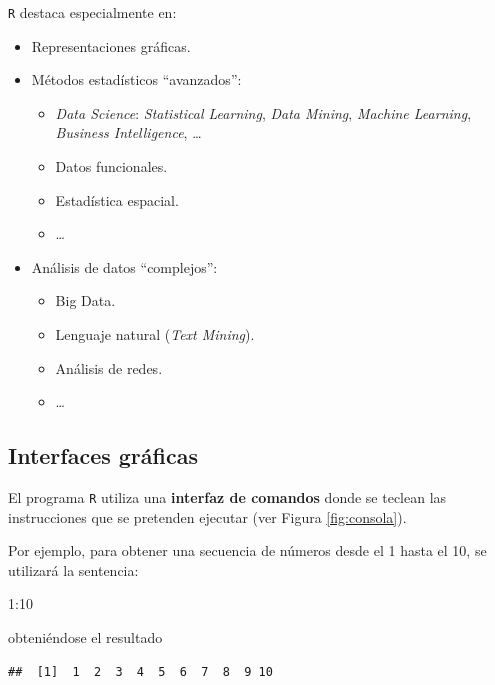 \documentclass[
]{book}
\newenvironment{Shaded}{\begin{snugshade}}{\end{snugshade}}
\newcommand{\DecValTok}[1]{\textcolor[rgb]{0.00,0.00,0.81}{#1}}
\newcommand{\SpecialCharTok}[1]{\textcolor[rgb]{0.00,0.00,0.00}{#1}}
\theoremstyle{break}
\begin{document}
\texttt{R} destaca especialmente en:

\begin{itemize}
\item
  Representaciones gráficas.
\item
  Métodos estadísticos ``avanzados'':

  \begin{itemize}
  \item
    \emph{Data Science}: \emph{Statistical Learning}, \emph{Data Mining},
    \emph{Machine Learning}, \emph{Business Intelligence}, \ldots{}
  \item
    Datos funcionales.
  \item
    Estadística espacial.
  \item
    \ldots{}
  \end{itemize}
\item
  Análisis de datos ``complejos'':

  \begin{itemize}
  \item
    Big Data.
  \item
    Lenguaje natural (\emph{Text Mining}).
  \item
    Análisis de redes.
  \item
    \ldots{}
  \end{itemize}
\end{itemize}

\hypertarget{interfaces-gruxe1ficas}{%
\subsection{Interfaces gráficas}\label{interfaces-gruxe1ficas}}

El programa \texttt{R}
utiliza una \textbf{interfaz de comandos} donde se teclean las instrucciones
que se pretenden ejecutar (ver Figura \ref{fig:consola}).

Por ejemplo, para obtener una secuencia de números desde el 1 hasta el
10, se utilizará la sentencia:

\begin{Shaded}
\begin{Highlighting}[]
\DecValTok{1}\SpecialCharTok{:}\DecValTok{10}
\end{Highlighting}
\end{Shaded}

obteniéndose el resultado

\begin{verbatim}
##  [1]  1  2  3  4  5  6  7  8  9 10
\end{verbatim}
\end{document}
